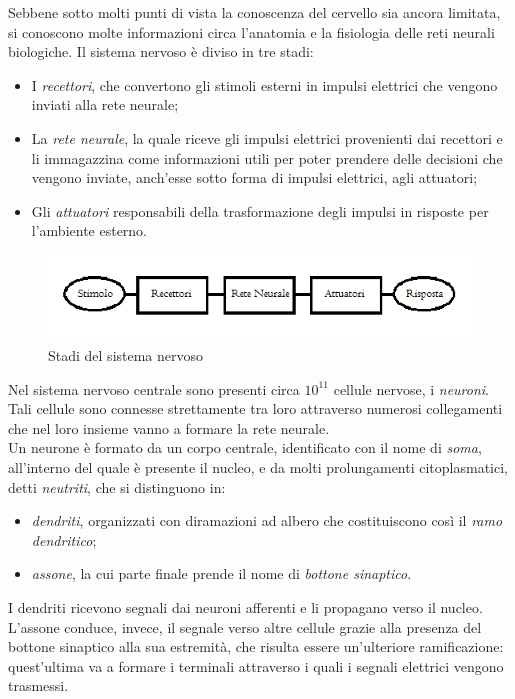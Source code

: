\documentclass[12pt,a4paper,oneside]{book}
\begin{document}
  		Sebbene sotto molti punti di vista la conoscenza del cervello sia ancora limitata, si conoscono molte informazioni circa l’anatomia e la fisiologia delle reti neurali biologiche.
  		Il sistema nervoso è diviso in tre stadi:
		\begin{itemize}
			\item I \emph{recettori}, che convertono gli stimoli esterni in impulsi elettrici che vengono inviati alla rete neurale;
			\item La \emph{rete neurale}, la quale riceve gli impulsi elettrici provenienti dai recettori e li immagazzina come informazioni utili per poter prendere delle decisioni che vengono inviate, anch'esse sotto forma di impulsi elettrici, agli attuatori;
			\item Gli \emph{attuatori} responsabili della trasformazione degli impulsi in risposte per l'ambiente esterno.
		\end{itemize}
		
		\begin{figure}[h]
		\centering
		\includegraphics[width=1\linewidth]{IMMAGINI/GRAFOSISTNERV}
		\caption{Stadi del sistema nervoso}
		\label{fig: stadi sistema nervoso}
		\end{figure}
		
		 Nel sistema nervoso centrale sono presenti circa $10^{11}$ cellule nervose, i \emph{neuroni}. Tali cellule sono connesse strettamente tra loro attraverso numerosi collegamenti che nel loro insieme vanno a formare la rete neurale. \\
		 Un neurone è formato da un corpo centrale, identificato con il nome di \emph{soma}, all'interno del quale è presente il nucleo, e da molti prolungamenti citoplasmatici, detti \emph{neutriti}, che si distinguono in:
		 \begin{itemize}
		 	\item \emph{dendriti}, organizzati con diramazioni ad albero che costituiscono così il \emph{ramo dendritico};
		 	\item \emph{assone}, la cui parte finale prende il nome di \emph{bottone sinaptico}.
		 \end{itemize}
		 
		 I dendriti ricevono segnali dai neuroni afferenti e li propagano verso il nucleo. L'assone conduce, invece, il segnale verso altre cellule grazie alla presenza del bottone sinaptico alla sua estremità, che risulta essere un'ulteriore ramificazione: quest'ultima va a formare i terminali attraverso i quali i segnali elettrici vengono trasmessi. 
		 
\end{document}
